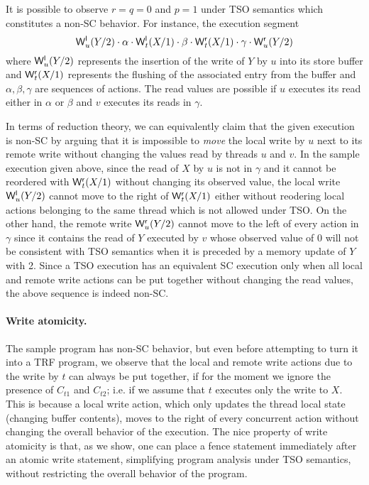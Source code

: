 \documentclass[preprint,9pt]{sigplanconf}
\begin{document}
It is possible to observe $r=q=0$ and $p=1$ under TSO semantics which constitutes a non-SC behavior.
For instance, the execution segment
\[
\mathsf{W}^{\mathsf{l}}_{u}(Y/2)\cdot \alpha\cdot \mathsf{W}^{\mathsf{l}}_{t}(X/1)\cdot \beta\cdot \mathsf{W}^{\mathsf{r}}_{t}(X/1)\cdot \gamma\cdot \mathsf{W}^{\mathsf{r}}_{u}(Y/2) 
\]
where $\mathsf{W}^{\mathsf{l}}_{u}(Y/2)$ represents the insertion of the write of $Y$ by $u$ into its store buffer and $\mathsf{W}^{\mathsf{r}}_{t}(X/1)$ represents the flushing of the associated entry from the buffer and $\alpha,\beta,\gamma$ are sequences of actions.
The read values are possible if $u$ executes its read either in $\alpha$ or $\beta$ and $v$ executes its reads in $\gamma$.

In terms of reduction theory, we can equivalently claim that the given execution is non-SC by arguing that it is impossible to {\em move} the local write by $u$ next to its remote write without changing the values read by threads $u$ and $v$.
In the sample execution given above, since the read of $X$ by $u$ is not in $\gamma$ and it cannot be reordered with $\mathsf{W}^{\mathsf{r}}_{t}(X/1)$ without changing its observed value, the local write $\mathsf{W}^{\mathsf{l}}_{u}(Y/2)$ cannot move to the right of $\mathsf{W}^{\mathsf{r}}_{t}(X/1)$ either without reodering local actions belonging to the same thread which is not allowed under TSO.
On the other hand, the remote write $\mathsf{W}^{\mathsf{r}}_{u}(Y/2)$ cannot move to the left of every action in $\gamma$ since it contains the read of $Y$ executed by $v$ whose observed value of 0 will not be consistent with TSO semantics when it is preceded by a memory update of $Y$ with 2. 
Since a TSO execution has an equivalent SC execution only when all local and remote write actions can be put together without changing the read values, the above sequence is indeed non-SC.

\paragraph{Write atomicity.}
The sample program has non-SC behavior, but even before attempting to turn it into a TRF program, we observe that the local and remote write actions due to the write by $t$ can always be put together, if for the moment we ignore the presence of $C_{t1}$ and $C_{t2}$; i.e. if we assume that $t$ executes only the write to $X$.
This is because a local write action, which only updates the thread local state (changing buffer contents), moves to the right of every concurrent action without changing the overall behavior of the execution.
The nice property of write atomicity is that, as we show, one can place a fence statement immediately after an atomic write statement, simplifying program analysis under TSO semantics, without restricting the overall behavior of the program.
\end{document}
